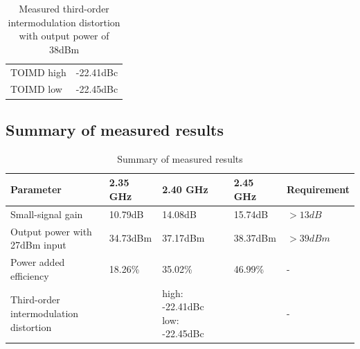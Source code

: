     \begin{table}[H]
	  \centering
	  \begin{tabular}{l l}
		  TOIMD high & -22.41dBc \\
		  TOIMD low & -22.45dBc
	  \end{tabular}
	  \caption{Measured third-order intermodulation distortion with output power of 38dBm}
	  \label{tab:Meas_Toimd}
  \end{table}

  \subsection{Summary of measured results}

  \begin{table}[H]
	  \centering
	  \begin{tabular}{p{4.5cm} | p{1.7cm} p{2.7cm} p{1.7cm} l}
		  Parameter & 2.35 GHz & 2.40 GHz & 2.45 GHz & Requirement \\
		  \hline
		  Small-signal gain & 10.79dB & 14.08dB & 15.74dB & $>13dB$ \\
		  Output power with 27dBm input & 34.73dBm & 37.17dBm & 38.37dBm & $>39dBm$ \\
		  Power added efficiency & 18.26\% & 35.02\% & 46.99\% & - \\
		  Third-order intermodulation distortion & & high: -22.41dBc low: -22.45dBc & & - \\
	  \end{tabular}
	  \caption{Summary of measured results}
	  \label{tab:Meas_Sum}
  \end{table}


    

